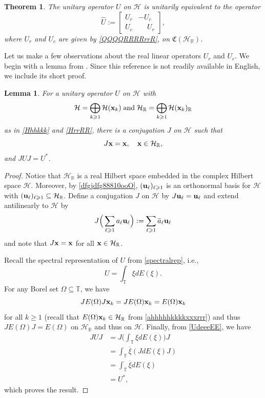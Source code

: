\documentclass{dis}
\newcommand{\phm}{\phantom{-}}
\theoremstyle{plain}
\newtheorem{Theorem}[equation]{Theorem}
\newtheorem{Lemma}[equation]{Lemma}
\theoremstyle{definition}
\def\R{\mathbb{R}}
\def\T{\mathbb{T}}
\renewcommand{\geq}{\geqslant}
\renewcommand{\subset}{\subseteq}
\renewcommand{\vec}[1]{{\bf #1}}
\newcommand{\0}{{\color{lightgray}0}}
\begin{document}
\begin{Theorem}\label{sfddsfsdf}
The unitary operator $U$ on $\mathcal{H}$ is unitarily equivalent to the operator
$$ \widehat{U} := \begin{bmatrix}
U_r & - U_c\\
U_c & \phm U_r
\end{bmatrix},$$
where $U_r$ and $U_c$ are given by \eqref{QQQQRRRRrrR},
on $\mathfrak{C}(\mathcal{H}_{\R})$.
\end{Theorem}

Let us make a few observations about the real linear operators $U_r$ and $U_c$. We begin with a lemma from \cite[Lem.~4, Lem.~5]{MR0190750}. Since this reference is not readily available in English, we include its short proof. 


\begin{Lemma}\label{GLuke}
For a unitary operator $U$ on $\mathcal{H}$ with
$$\mathcal{H} = \bigoplus_{k \geq 1} \mathcal{H}(\vec{x}_k) \; \mbox{and} \; 
\mathcal{H}_{\R} = \bigoplus_{k \geq 1} \mathcal{H}(\vec{x}_k)_{\R}$$
as in \eqref{Hhhkkk} and \eqref{HrrRR}, there is a conjugation $J$ on $\mathcal{H}$ such that
\begin{equation}\label{112Sdfsdf}
J\vec{x} = \vec{x}, \quad \vec{x} \in \mathcal{H}_{\R},
\end{equation} and  $J U J =U^{*}$.
\end{Lemma}

\begin{proof}
Notice that $\mathcal{H}_{\R}$ is a real Hilbert space embedded in the complex Hilbert space $\mathcal{H}$. Moreover, by \eqref{dfgjdfg88810ooO}, $(\vec{u}_{\ell})_{\ell \geq 1}$ is an orthonormal basis for $\mathcal{H}$ with $(\vec{u}_{\ell})_{\ell \geq 1} \subset  \mathcal{H}_{\R}$. Define a conjugation $J$ on $\mathcal{H}$ by $J \vec{u}_{\ell} = \vec{u}_{\ell}$ and extend antilinearly  to $\mathcal{H}$ by 
$$J \Big(\sum_{\ell \geq 1} a_{\ell} \vec{u}_{\ell} \Big) := \sum_{\ell \geq 1} \bar a_{\ell} \vec{u}_{\ell}$$ and note that $J \vec{x} = \vec{x}$ for all $\vec{x} \in \mathcal{H}_{\R}$. 

Recall the spectral representation of $U$ from \eqref{spectralrep}, i.e., 
\begin{equation}\label{UdeeeEE}
U = \int_{\T} \xi d E(\xi).
\end{equation}
For any Borel set $\Omega \subset \T$, we have 
$$J E(\Omega) J \vec{x}_{k} = J E(\Omega) \vec{x}_{k} = E(\Omega) \vec{x}_k$$
for all $k \geq 1$ (recall that $E(\Omega) \vec{x}_k \in \mathcal{H}_{\R}$ from \eqref{ahhhhhkkkkxxxrrr}) and
thus $J E(\Omega) J = E(\Omega)$ on $\mathcal{H}_{\R}$ and thus on $\mathcal{H}$. Finally, from \eqref{UdeeeEE}, we have 
\begin{align*}
J U J & = J \Big(\int_{\T} \xi d E(\xi) \Big)J\\
& = \int_{\T} \overline{\xi} (J dE(\xi) J)\\
& = \int_{\T} \overline{\xi} d E(\xi)\\
& = U^{*},
\end{align*}
which proves the result. 
\end{proof}
\end{document}
